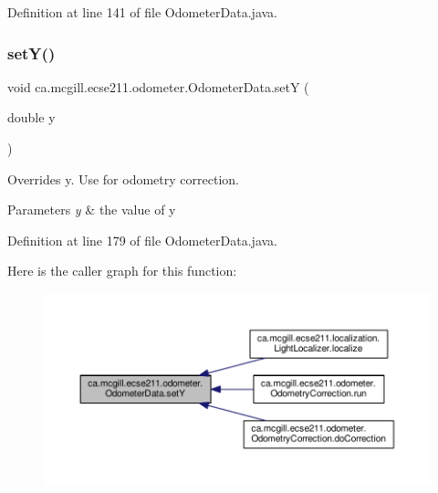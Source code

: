 Definition at line 141 of file Odometer\+Data.\+java.

\mbox{\label{classca_1_1mcgill_1_1ecse211_1_1odometer_1_1_odometer_data_a82986438cd462e66520bc62bb4bd2b75}} 
\subsubsection{\texorpdfstring{set\+Y()}{setY()}}
{\footnotesize\ttfamily void ca.\+mcgill.\+ecse211.\+odometer.\+Odometer\+Data.\+setY (\begin{DoxyParamCaption}\item[{double}]{y }\end{DoxyParamCaption})}

Overrides y. Use for odometry correction.


\begin{DoxyParams}{Parameters}
{\em y} & the value of y \\
\hline
\end{DoxyParams}


Definition at line 179 of file Odometer\+Data.\+java.

Here is the caller graph for this function\+:
\nopagebreak
\begin{figure}[H]
\begin{center}
\leavevmode
\includegraphics[width=350pt]{classca_1_1mcgill_1_1ecse211_1_1odometer_1_1_odometer_data_a82986438cd462e66520bc62bb4bd2b75_icgraph}
\end{center}
\end{figure}
\mbox{\label{classca_1_1mcgill_1_1ecse211_1_1odometer_1_1_odometer_data_aaa06f190d634299fcb1b97a1891dad85}} 

